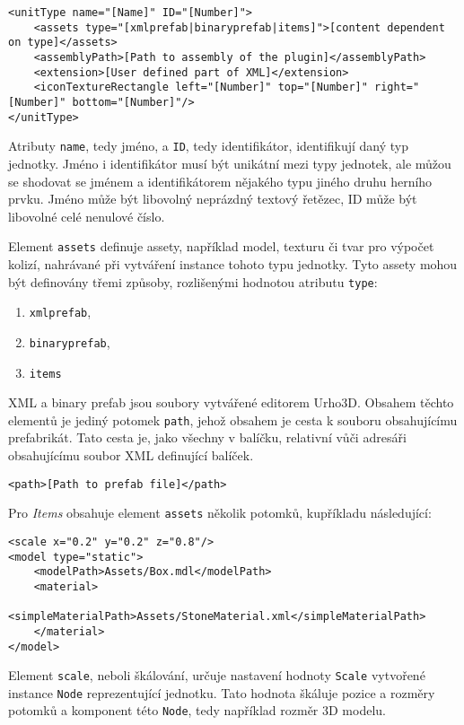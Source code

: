 \begin{lstlisting}
<unitType name="[Name]" ID="[Number]">
	<assets type="[xmlprefab|binaryprefab|items]">[content dependent on type]</assets>
	<assemblyPath>[Path to assembly of the plugin]</assemblyPath>
	<extension>[User defined part of XML]</extension>
	<iconTextureRectangle left="[Number]" top="[Number]" right="[Number]" bottom="[Number]"/>
</unitType>
\end{lstlisting}

Atributy \texttt{name}, tedy jméno, a \texttt{ID}, tedy identifikátor, identifikují daný typ jednotky. Jméno i identifikátor musí být unikátní mezi typy jednotek, ale můžou se shodovat se jménem a identifikátorem nějakého typu jiného druhu herního prvku. Jméno může být libovolný neprázdný textový řetězec, ID může být libovolné celé nenulové číslo.

Element \texttt{assets} definuje assety, například model, texturu či tvar pro výpočet kolizí, nahrávané při vytváření instance tohoto typu jednotky. Tyto assety mohou být definovány třemi způsoby, rozlišenými hodnotou atributu \texttt{type}:

\begin{enumerate}
	\item \texttt{xmlprefab},
	\item \texttt{binaryprefab},
	\item \texttt{items}
\end{enumerate}

XML a binary prefab jsou soubory vytvářené editorem Urho3D. Obsahem těchto elementů je jediný potomek \texttt{path}, jehož obsahem je cesta k souboru obsahujícímu prefabrikát. Tato cesta je, jako všechny v balíčku, relativní vůči adresáři obsahujícímu soubor XML definující balíček.
\begin{lstlisting}
<path>[Path to prefab file]</path>
\end{lstlisting}

Pro \textit{Items} obsahuje element \texttt{assets} několik potomků, kupříkladu následující:
\begin{lstlisting}
<scale x="0.2" y="0.2" z="0.8"/>
<model type="static">
	<modelPath>Assets/Box.mdl</modelPath>
	<material>
		<simpleMaterialPath>Assets/StoneMaterial.xml</simpleMaterialPath>
	</material>
</model>
\end{lstlisting}
Element \texttt{scale}, neboli škálování, určuje nastavení hodnoty \texttt{Scale} vytvořené instance \texttt{Node} reprezentující jednotku. Tato hodnota škáluje pozice a rozměry potomků a komponent této \texttt{Node}, tedy například rozměr 3D modelu. 

